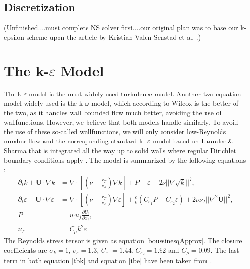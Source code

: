 \documentclass[11pt]{article}
\begin{document}
{%
\subsection{Discretization}
(Unfinished....must complete NS solver first....our original plan was to base our k-epsilon
scheme upon the article by Kristian Valen-Senstad et al. \cite{3}.)


\section{The k-$\varepsilon$ Model}
The k-$\varepsilon$ model is the most widely used turbulence model. Another two-equation 
model widely used is the k-$\omega$ model, which according to Wilcox\cite{1} is the better of 
the two, as it handles wall bounded flow much better, avoiding the use of wallfunctions. However,
we believe that both models handle similarly. To avoid the use of these so-called wallfunctions, 
we will only consider low-Reynolds number flow and the corresponding standard k- 
$\varepsilon$ model based on Launder \& Sharma \cite{2} that is integrated all the way up to 
solid walls where regular Dirichlet boundary conditions apply \cite{3}. The model is summarized 
by the following equations :
\begin{align}
\label{tbk} %
\partial_t k+ \mathbf{U} \cdot\nabla k &= \nabla \cdot \left[ \left( \nu + \frac{\nu_T}{\sigma_k} \right) 
\nabla k\right] + P - \varepsilon - 2\nu || \nabla \sqrt{k}||^2, \\
\label{tbe} %
\partial_t \varepsilon+ \mathbf{U} \cdot\nabla \varepsilon &= \nabla \cdot \left[ \left( \nu + 
\frac{\nu_T}{\sigma_\varepsilon} \right) \nabla \varepsilon\right] +
 \frac{\varepsilon}{k}(C_{\varepsilon_1}P - C_{\varepsilon_2} \varepsilon)  + 2\nu \nu_T || \nabla^2 \mathbf{U}||^2, \\
\label{production} %
P &= \overline{u_iu_j} \frac{\partial U_i} {\partial x_j}, \\
\label{nuT} %
\nu_T &= C_\mu k^2\varepsilon.
\end{align}
The Reynolds stress tensor is given as equation \eqref{boussinesqApprox}. The closure 
coefficients are $\sigma_k = 1$, $\sigma_\varepsilon = 1.3$, $C_{\varepsilon_1} = 1.44$,
$C_{\varepsilon_2} = 1.92$ and $C_\mu = 0.09$.  The last term in both equation \eqref{tbk} 
and equation \eqref{tbe} have been taken from \cite{3}.


}
\end{document}
